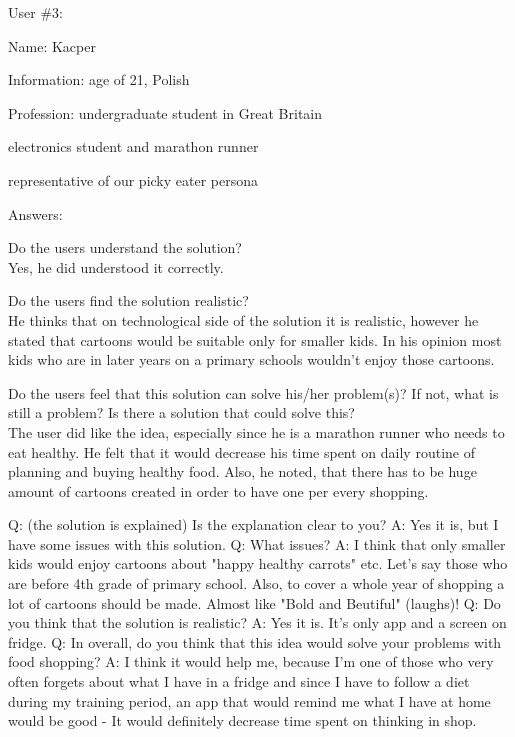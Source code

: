 \documentclass[a4paper,10pt,oneside]{scrreprt}
\begin{document}
\bigskip
\bigskip
User \#3:
\begin{compactitem}
	\item Name: Kacper
	\item Information: age of 21, Polish
	\item Profession: undergraduate student in Great Britain
	\item electronics student and marathon runner
	\item representative of our picky eater persona
\end{compactitem}
\bigskip

Answers:
\begin{compactitem}
	\item Do the users understand the solution?\\
		Yes, he did understood it correctly.\\
	
	\item Do the users find the solution realistic?\\
		He thinks that on technological side of the solution it is realistic, however he stated that cartoons would be suitable only for smaller kids. In his opinion 
most kids who are in later years on a primary schools wouldn't enjoy those cartoons.
\\
		
	\item Do the users feel that this solution can solve his/her problem(s)? If not, what is still
	a problem? Is there a solution that could solve this?\\
		The user did like the idea, especially since he is a marathon runner who needs to eat healthy. He felt that
it would decrease his time spent on daily routine of planning and buying healthy food. Also, he noted, that there has to be huge amount of cartoons created in order to have one per every shopping.

\end{compactitem}

Q: (the solution is explained) Is the explanation clear to you?
A: Yes it is, but I have some issues with this solution.
Q: What issues?
A: I think that only smaller kids would enjoy cartoons about "happy healthy carrots" etc. Let's say those who are before 4th grade of primary school. Also, 
to cover a whole year of shopping a lot of cartoons should be made. Almost like "Bold and Beutiful" (laughs)!
Q: Do you think that the solution is realistic?
A: Yes it is. It's only app and a screen on fridge.
Q: In overall, do you think that this idea would solve your problems with food shopping?
A: I think it would help me, because I'm one of those who very often forgets about what I have in a fridge and since I have to follow a diet during my
training period, an app that would remind me what I have at home would be good - It would definitely decrease time spent on thinking in shop.
\end{document}
